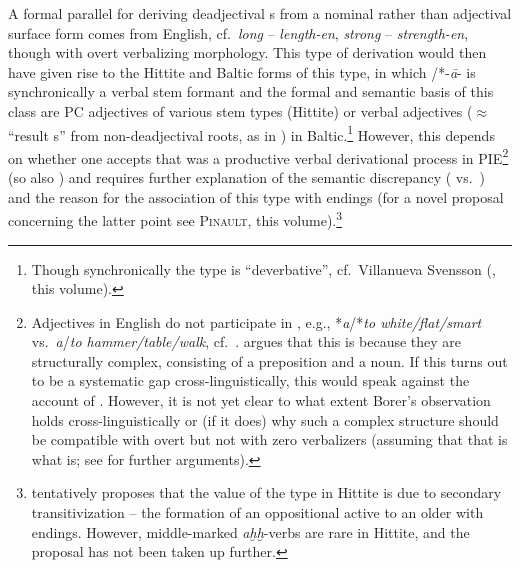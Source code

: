 \documentclass[output=paper,colorlinks,citecolor=brown]{langscibook}
\begin{document}
A formal parallel for deriving deadjectival  s from a nominal rather than adjectival surface form comes from English, cf.\ \textit{long} -- \textit{length-en}, \textit{strong} -- \textit{strength-en}, though with overt verbalizing morphology. This type of derivation would then have given rise to the Hittite and Baltic forms of this type, in which /*-\textit{ā}- is synchronically a verbal stem formant and the formal and semantic basis of this class are PC adjectives of various stem types (Hittite) or verbal adjectives ($\approx$ ``result s'' from non-deadjectival roots, as in ) in Baltic.\footnote{Though synchronically the type is ``deverbative'', cf.\ Villanueva Svensson (\citeyear[392--395]{VillanuevaSvensson2020}, this volume).} However, this depends on whether one accepts that  was a productive verbal derivational process in PIE\footnote{Adjectives in English do not participate in , e.g., *\textit{a}/*\textit{to white/flat/smart} vs.\ \textit{a}/\textit{to hammer/table/walk}, cf.\ \citealt[371--378]{Borer2013}. \citet{AcedoMatellan2022FSBorer} argues that this is because they are structurally complex, consisting of a preposition and a noun. If this turns out to be a systematic gap cross-linguistically, this would speak against the  account of  \citet{VillanuevaSvensson2021}. However, it is not yet clear to what extent Borer's observation holds cross-linguistically or (if it does) why such a complex structure should be compatible with overt but not with zero verbalizers (assuming that that is what  is; see \citealt[47--52]{GrestenbergerKastner2022} for further arguments).} (so also \citealt{VillanuevaSvensson2021}) and requires further explanation of the semantic discrepancy ( vs.\ ) and the reason for the association of this type with  endings (for a novel proposal concerning the latter point see \textsc{Pinault}, this volume).\footnote{\citet[146]{Jasanoff2003} tentatively proposes that the  value of the type in Hittite is due to secondary transitivization -- the formation of an oppositional active  to an older   with  endings. However, middle-marked  \textit{aḫḫ}-verbs  are rare in Hittite, and the proposal has not been taken up further.}
\end{document}
